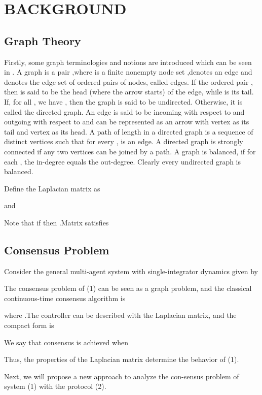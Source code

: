 \documentclass[english]{cccconf}
\begin{document}
\section{BACKGROUND}

\subsection{Graph Theory }

Firstly, some graph terminologies and notions are introduced which can be seen in \cite{Mesbahi2010}.
A graph is a pair ,where  is a finite nonempty node set ,denotes an edge and  denotes the edge  set of ordered pairs of nodes, called edges. If the ordered pair , then  is said to be the head (where the arrow starts) of the edge, while  is its tail. If, for all , we have , then the graph is said to be undirected. Otherwise, it is called the directed graph. An edge  is said to be incoming with respect to   and outgoing with respect to   and can be represented as an arrow with vertex   as its tail and vertex   as its head. A path of length  in a directed graph is a sequence   of  distinct vertices such that for every  ,  is an edge. A directed graph is strongly connected if any two vertices can be joined by a path. A graph is balanced, if for each  , the in-degree equals the out-degree. Clearly every undirected graph is balanced.

Define the Laplacian matrix    as

 and 


Note that if  then  .Matrix   satisfies


\subsection{Consensus Problem }

Consider the general multi-agent system with single-integrator dynamics given by

The consensus problem of (1) can be seen as a graph problem,  and the classical continuous-time consensus algorithm is

where  .The controller can be described with the Laplacian matrix, and the  compact form is

We say that consensus is achieved when

Thus, the properties of the Laplacian matrix  determine the behavior of  (1).

Next, we will propose a new approach to analyze the con-sensus problem of system (1) with the protocol (2).
\end{document}
